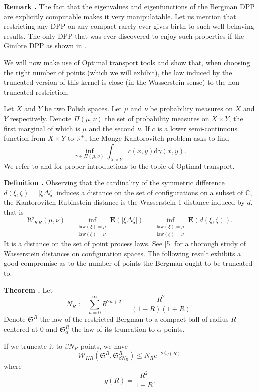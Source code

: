 \documentclass[11pt]{article}
\newcounter{cnt}
\newcommand{\cnt}{\thecnt \stepcounter{cnt}}
\begin{document}
\textbf{Remark \cnt.} The fact that the eigenvalues and eigenfunctions of the Bergman DPP are explicitly computable makes it very manipulatable. Let us mention that restricting any DPP on any compact rarely ever gives birth to such well-behaving results. The only DPP that was ever discovered to enjoy such properties if the Ginibre DPP as shown in \cite{DecreusefondMoroz2021}.

We will now make use of Optimal transport tools and show that, when choosing the right number of points (which we will exhibit), the law induced by the truncated version of this kernel is close (in the Wasserstein sense) to the non-truncated restriction.

Let $X$ and $Y$ be two Polish spaces. Let $\mu$ and $\nu$ be probability measures on $X$ and $Y$ respectively. Denote $\Pi(\mu, \nu)$ the set of probability measures on $X \times Y$, the first marginal of which is $\mu$ and the second $\nu$. If $c$ is a lower semi-continuous function from $X \times Y$ to $\mathbb{R}^+$, the Monge-Kantorovitch problem asks to find
\[
\inf_{\gamma \in \Pi(\mu,\nu)} \int_{X \times Y} c(x,y) \mathrm d\gamma(x,y).
\]
We refer to \cite{Villani2021} and \cite{Villani2009} for proper introductions to the topic of Optimal transport.

\textbf{Definition \cnt.} Observing that the cardinality of the symmetric difference $d(\xi, \zeta) = |\xi \Delta \zeta|$ induces a distance on the set of configurations on a subset of $\mathbb{C}$, the Kantorovitch-Rubinstein distance is the Wasserstein-1 distance induced by $d$, that is
\[
\mathcal{W}_{KR}(\mu, \nu) = \inf_{\substack{\text{law}(\xi)=\mu \\ \text{law}(\zeta)=\nu}} \mathbf{E}(|\xi \Delta \zeta|) = \inf_{\substack{\text{law}(\xi)=\mu \\ \text{law}(\zeta)=\nu}} \mathbf{E}(d(\xi, \zeta)).
\]
It is a distance on the set of point process laws. See [5] for a thorough study of Wasserstein distances on configuration spaces. The following result exhibits a good compromise as to the number of points the Bergman ought to be truncated to.

\textbf{Theorem \cnt.} Let
\[
N_R := \sum_{n=0}^\infty R^{2n+2} = \frac{R^2}{(1-R)(1+R)}.
\]
Denote $\mathfrak{S}^R$ the law of the restricted Bergman to a compact ball of radius $R$ centered at 0 and $\mathfrak{S}_\alpha^R$ the law of its truncation to $\alpha$ points.

If we truncate it to $\beta N_R$ points, we have
\begin{equation}
\mathcal{W}_{KR}(\mathfrak{S}^R, \mathfrak{S}_{\beta N_R}^R) \leqslant N_R e^{-2\beta g(R)}
\end{equation}
where
\[
g(R) = \frac{R^2}{1+R}.
\]
\end{document}
